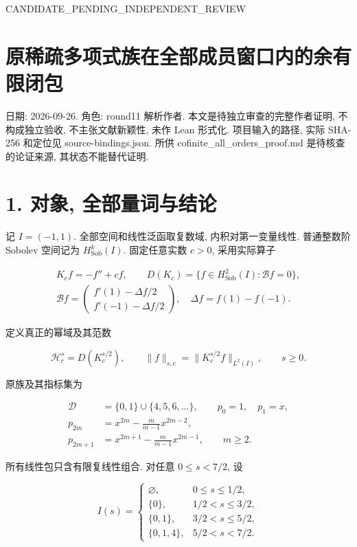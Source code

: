 \documentclass[UTF8,fontset=fandol,11pt,a4paper]{ctexart}
\begin{document}
CANDIDATE\_PENDING\_INDEPENDENT\_REVIEW


\section*{原稀疏多项式族在全部成员窗口内的余有限闭包}

日期: 2026-09-26. 角色: round11 解析作者. 本文是待独立审查的完整作者证明, 不构成独立验收, 不主张文献新颖性, 未作 Lean 形式化. 项目输入的路径, 实际 SHA-256 和定位见 source-bindings.json. 所供 cofinite\_all\_orders\_proof.md 是待核查的论证来源, 其状态不能替代证明.


\section*{1. 对象, 全部量词与结论}

记 \(I=(-1,1)\). 全部空间和线性泛函取复数域, 内积对第一变量线性. 普通整数阶 Sobolev 空间记为 \(H_{\mathrm{Sob}}^k(I)\). 固定任意实数 \(c>0\), 采用实际算子


\[
\begin{gathered}
 K_cf=-f''+cf,\qquad
 D(K_c)=\{f\in H_{\mathrm{Sob}}^2(I):\mathcal Bf=0\},
 \\
 \mathcal Bf=
 \begin{pmatrix}f'(1)-\Delta f/2\\f'(-1)-\Delta f/2\end{pmatrix},
 \quad \Delta f=f(1)-f(-1).
\end{gathered}
 \tag{1.1}
\]


定义真正的幂域及其范数


\[
 \mathcal H_c^s=D(K_c^{s/2}),\qquad
 \|f\|_{s,c}=\|K_c^{s/2}f\|_{L^2(I)},\qquad s\ge0.
 \tag{1.2}
\]


原族及其指标集为


\[
 \begin{split}
 \mathcal D&=\{0,1\}\cup\{4,5,6,\ldots\},\qquad p_0=1,\quad p_1=x,\\
 p_{2m}&=x^{2m}-\frac m{m-1}x^{2m-2},\\
 p_{2m+1}&=x^{2m+1}-\frac m{m-1}x^{2m-1},\qquad m\ge2.
 \end{split}
 \tag{1.3}
\]


所有线性包只含有限复线性组合. 对任意 \(0\le s<7/2\), 设


\[
 I(s)=
 \begin{cases}
 \varnothing,&0\le s\le1/2,\\
 \{0\},&1/2<s\le3/2,\\
 \{0,1\},&3/2<s\le5/2,\\
 \{0,1,4\},&5/2<s<7/2.
 \end{cases}
 \tag{1.4}
\]
\end{document}
